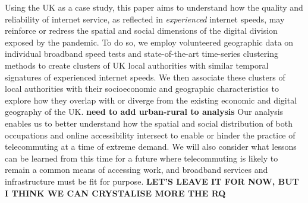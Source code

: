 \documentclass[]{interact}
\theoremstyle{plain}%
\theoremstyle{definition}
\theoremstyle{remark}
\begin{document}
Using the UK as a case study, this paper aims to understand how the
quality and reliability of internet service, as reflected in
\emph{experienced} internet speeds, may reinforce or redress the spatial
and social dimensions of the digital division exposed by the pandemic.
To do so, we employ volunteered geographic data on individual broadband
speed tests and state-of-the-art time-series clustering methods to
create clusters of UK local authorities with similar temporal signatures
of experienced internet speeds. We then associate these clusters of
local authorities with their socioeconomic and geographic
characteristics to explore how they overlap with or diverge from the
existing economic and digital geography of the UK. \textbf{need to add
urban-rural to analysis} Our analysis enables us to better understand
how the spatial and social distribution of both occupations and online
accessibility intersect to enable or hinder the practice of
telecommuting at a time of extreme demand. We will also consider what
lessons can be learned from this time for a future where telecommuting
is likely to remain a common means of accessing work, and broadband
services and infrastructure must be fit for purpose. \textbf{LET'S LEAVE
IT FOR NOW, BUT I THINK WE CAN CRYSTALISE MORE THE RQ}
\end{document}
